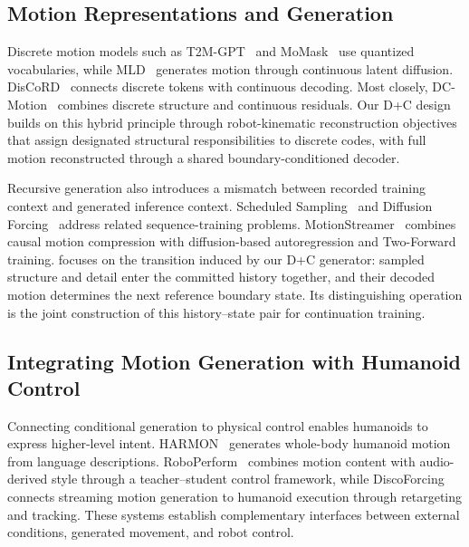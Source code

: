 \subsection{Motion Representations and Generation}

Discrete motion models such as T2M-GPT~\cite{zhang2023t2mgpt}
and MoMask~\cite{guo2024momask} use quantized vocabularies,
while MLD~\cite{chen2023mld} generates motion through
continuous latent diffusion.
DisCoRD~\cite{cho2025discord} connects discrete tokens
with continuous decoding.
Most closely, DC-Motion~\cite{wang2026dcmotion} combines
discrete structure and continuous residuals.
Our D+C design builds on this hybrid principle through
robot-kinematic reconstruction objectives that assign
designated structural responsibilities to discrete codes,
with full motion reconstructed through a shared
boundary-conditioned decoder.

Recursive generation also introduces a mismatch between
recorded training context and generated inference context.
Scheduled Sampling~\cite{bengio2015scheduled} and
Diffusion Forcing~\cite{chen2024diffusionforcing} address
related sequence-training problems.
MotionStreamer~\cite{xiao2025motionstreamer} combines
causal motion compression with diffusion-based autoregression
and Two-Forward training.
\cof{} focuses on the transition induced by our D+C
generator: sampled structure and detail enter the committed
history together, and their decoded motion determines
the next reference boundary state.
Its distinguishing operation is the joint construction of
this history--state pair for continuation training.

\subsection{Integrating Motion Generation with Humanoid Control}

Connecting conditional generation to physical control
enables humanoids to express higher-level intent.
HARMON~\cite{jiang2025harmon} generates whole-body humanoid
motion from language descriptions.
RoboPerform~\cite{li2026roboperform} combines motion
content with audio-derived style through a teacher--student
control framework, while
DiscoForcing~\cite{ji2026discoforcing} connects streaming
motion generation to humanoid execution through retargeting
and tracking.
These systems establish complementary interfaces between
external conditions, generated movement, and robot control.

